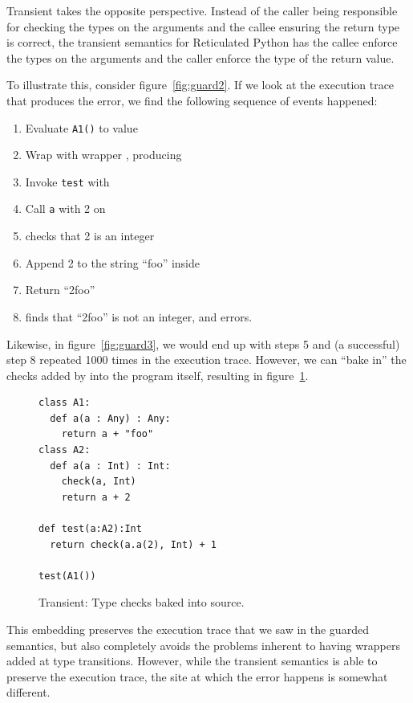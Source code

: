 \documentclass[preprint]{sigplanconf}
\newcommand{\xt}[1]{{\sf{#1}}\xspace}
\begin{document}
Transient takes the opposite perspective. Instead of the caller being responsible for
checking the types on the arguments and the callee ensuring the return type is correct,
the transient semantics for Reticulated Python has the callee enforce the types on the
arguments and the caller enforce the type of the return value.

To illustrate this, consider figure~\ref{fig:guard2}. If we look at the execution trace that produces
the error, we find the following sequence of events happened:
\begin{enumerate}
\item Evaluate \verb|A1()| to value \xt{v}
\item Wrap \xt{v} with wrapper \xt{A2W}, producing \xt{vw}
\item Invoke \verb|test| with \xt{vw}
\item Call \verb|a| with 2 on \xt{vw}
\item \xt{A2W} checks that 2 is an integer
\item Append 2 to the string ``foo'' inside \xt{A1.a}
\item Return ``2foo'' 
\item \xt{A2W} finds that ``2foo'' is not an integer, and errors.
\end{enumerate}

Likewise, in figure~\ref{fig:guard3}, we would end up with steps 5 and (a successful) step 8 repeated
1000 times in the execution trace. However, we can ``bake in'' the checks added by \xt{A2W} into the
program itself, resulting in figure~\ref{fig:trans1}.

\begin{figure}[h]
\begin{verbatim}
class A1:
  def a(a : Any) : Any:
    return a + "foo"
class A2:
  def a(a : Int) : Int:
    check(a, Int)
    return a + 2

def test(a:A2):Int
  return check(a.a(2), Int) + 1

test(A1())
\end{verbatim}
\caption{Transient: Type checks baked into source.}
\label{fig:trans1}
\end{figure}

This embedding preserves the execution trace that we saw in the guarded semantics, but also completely
avoids the problems inherent to having wrappers added at type transitions. However, while the transient
semantics is able to preserve the execution trace, the site at which the error happens is somewhat different.
\end{document}
